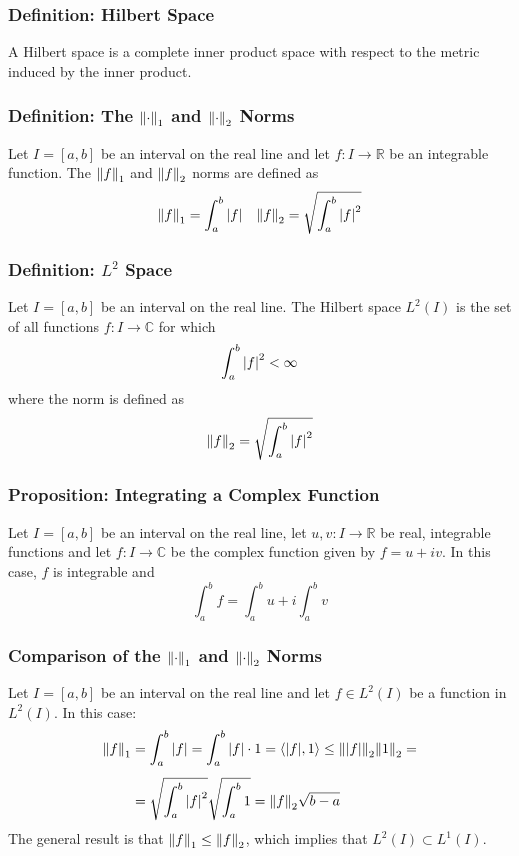 \documentclass[11pt, a4paper]{article}
\newcommand{\R}{\mathbb{R}} %
\begin{document}
\subsubsection{Definition: Hilbert Space}
A Hilbert space is a complete inner product space with respect to the metric induced by the inner product. 

\subsubsection{Definition: The $ \norm{\cdot}_1 $ and $ \norm{\cdot}_2  $ Norms}
Let $ I = [a, b] $ be an interval on the real line and let $ f:I \to \R $ be an integrable function. The $ \norm{f}_1  $ and $ \norm{f}_2 $ norms are defined as
\begin{align*}
	\norm{f}_1 = \int_{a}^{b} \abs{f} && \norm{f}_2 = \sqrt{\int_{a}^{b} \abs{f}^2}
\end{align*}

\subsubsection{Definition: $ L^2 $ Space}
Let $ I = [a, b] $ be an interval on the real line. The Hilbert space $ L^2(I) $ is the set of all functions $ f : I \to \mathbb{C} $ for which 
\begin{equation*}
	\int_{a}^{b} \abs{f}^2 < \infty
\end{equation*}
where the norm is defined as
\begin{equation*}
	\norm{f}_2 = \sqrt{\int_{a}^{b} \abs{f}^2}
\end{equation*}

\subsubsection{Proposition: Integrating a Complex Function}
Let $ I = [a, b] $ be an interval on the real line, let $ u, v : I \to \R $ be real, integrable functions and let $ f : I \to \mathbb{C}$ be the complex function given by $ f = u + iv $. In this case, $ f $ is integrable and
\begin{equation*}
	\int_{a}^{b} f = \int_{a}^{b} u + i\int_{a}^{b} v
\end{equation*}

\subsubsection{Comparison of the $ \norm{\cdot}_1 $ and $ \norm{\cdot}_2 $ Norms}
Let $ I = [a, b] $ be an interval on the real line and let $ f \in L^2(I) $ be a function in $ L^2(I) $. In this case:
\begin{align*}
	\norm{f}_1 &= \int_{a}^{b} \abs{f} = \int_{a}^{b} \abs{f} \cdot 1  = \expval{\abs{f}, 1} \leq \norm{\abs{f}}_2 \norm{1}_2 = \\[1.0ex] & =\sqrt{\int_{a}^{b} \abs{f}^2} \sqrt{\int_{a}^{b} 1 } = \norm{f}_{2} \sqrt{b - a}
\end{align*}
The general result is that $ \norm{f}_1 \leq \norm{f}_2 $, which implies that $ L^2(I) \subset L^1(I) $.
\end{document}
